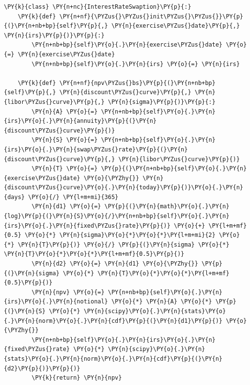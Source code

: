 \begin{Answer}
\begin{tcolorbox}[breakable, size=fbox, boxrule=1pt, pad at break*=1mm,colback=cellbackground, colframe=cellborder]
\begin{Verbatim}[commandchars=\\\{\}]
\PY{k}{class} \PY{n+nc}{InterestRateSwaption}\PY{p}{:}
    \PY{k}{def} \PY{n+nf}{\PYZus{}\PYZus{}init\PYZus{}\PYZus{}}\PY{p}{(}\PY{n+nb+bp}{self}\PY{p}{,} \PY{n}{exercise\PYZus{}date}\PY{p}{,} \PY{n}{irs}\PY{p}{)}\PY{p}{:}
        \PY{n+nb+bp}{self}\PY{o}{.}\PY{n}{exercise\PYZus{}date} \PY{o}{=} \PY{n}{exercise\PYZus{}date}
        \PY{n+nb+bp}{self}\PY{o}{.}\PY{n}{irs} \PY{o}{=} \PY{n}{irs}
		
    \PY{k}{def} \PY{n+nf}{npv\PYZus{}bs}\PY{p}{(}\PY{n+nb+bp}{self}\PY{p}{,} \PY{n}{discount\PYZus{}curve}\PY{p}{,} \PY{n}{libor\PYZus{}curve}\PY{p}{,} \PY{n}{sigma}\PY{p}{)}\PY{p}{:}
        \PY{n}{A} \PY{o}{=} \PY{n+nb+bp}{self}\PY{o}{.}\PY{n}{irs}\PY{o}{.}\PY{n}{annuity}\PY{p}{(}\PY{n}{discount\PYZus{}curve}\PY{p}{)}
        \PY{n}{S} \PY{o}{=} \PY{n+nb+bp}{self}\PY{o}{.}\PY{n}{irs}\PY{o}{.}\PY{n}{swap\PYZus{}rate}\PY{p}{(}\PY{n}{discount\PYZus{}curve}\PY{p}{,} \PY{n}{libor\PYZus{}curve}\PY{p}{)}
        \PY{n}{T} \PY{o}{=} \PY{p}{(}\PY{n+nb+bp}{self}\PY{o}{.}\PY{n}{exercise\PYZus{}date} \PY{o}{\PYZhy{}} \PY{n}{discount\PYZus{}curve}\PY{o}{.}\PY{n}{today}\PY{p}{)}\PY{o}{.}\PY{n}{days} \PY{o}{/} \PY{l+m+mi}{365}
        \PY{n}{d1} \PY{o}{=} \PY{p}{(}\PY{n}{math}\PY{o}{.}\PY{n}{log}\PY{p}{(}\PY{n}{S}\PY{o}{/}\PY{n+nb+bp}{self}\PY{o}{.}\PY{n}{irs}\PY{o}{.}\PY{n}{fixed\PYZus{}rate}\PY{p}{)} \PY{o}{+} \PY{l+m+mf}{0.5} \PY{o}{*} \PY{n}{sigma}\PY{o}{*}\PY{o}{*}\PY{l+m+mi}{2} \PY{o}{*} \PY{n}{T}\PY{p}{)} \PY{o}{/} \PY{p}{(}\PY{n}{sigma} \PY{o}{*} \PY{n}{T}\PY{o}{*}\PY{o}{*}\PY{l+m+mf}{0.5}\PY{p}{)}
        \PY{n}{d2} \PY{o}{=} \PY{n}{d1} \PY{o}{\PYZhy{}} \PY{p}{(}\PY{n}{sigma} \PY{o}{*} \PY{n}{T}\PY{o}{*}\PY{o}{*}\PY{l+m+mf}{0.5}\PY{p}{)}
        \PY{n}{npv} \PY{o}{=} \PY{n+nb+bp}{self}\PY{o}{.}\PY{n}{irs}\PY{o}{.}\PY{n}{notional} \PY{o}{*} \PY{n}{A} \PY{o}{*} \PY{p}{(}\PY{n}{S} \PY{o}{*} \PY{n}{scipy}\PY{o}{.}\PY{n}{stats}\PY{o}{.}\PY{n}{norm}\PY{o}{.}\PY{n}{cdf}\PY{p}{(}\PY{n}{d1}\PY{p}{)} \PY{o}{\PYZhy{}}
        \PY{n+nb+bp}{self}\PY{o}{.}\PY{n}{irs}\PY{o}{.}\PY{n}{fixed\PYZus{}rate} \PY{o}{*} \PY{n}{scipy}\PY{o}{.}\PY{n}{stats}\PY{o}{.}\PY{n}{norm}\PY{o}{.}\PY{n}{cdf}\PY{p}{(}\PY{n}{d2}\PY{p}{)}\PY{p}{)}
        \PY{k}{return} \PY{n}{npv}
		

\end{Verbatim}
\end{tcolorbox}
\end{Answer}

